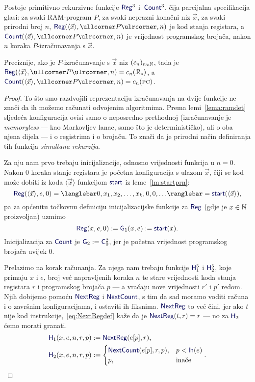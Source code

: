 \begin{lema}[{name=[primitivna rekurzivnost RAM-izračunavanja]}]\label{lm:RegCountprn}
Postoje primitivno rekurzivne funkcije $\f{Reg}^3$ i\, $\f{Count}^3$, čija parcijalna specifikacija glasi:
za svaki RAM-program $P$, za svaki neprazni konačni niz $\vec x$, za svaki prirodni broj $n$, $\f{Reg}(\langle \vec x\rangle,\kprog{P},n)$ je kod stanja registara, a $\f{Count}(\langle \vec x\rangle,\kprog{P},n)$ je vrijednost programskog brojača, nakon $n$ koraka $P$-izračunavanja s $\vec x$.
\end{lema}
Preciznije, ako je $P$-izračunavanje s $\vec x$ niz $(c_n)_{n\in{\mathbb N}}$, tada je $\f{Reg}(\langle\vec x\rangle, \kprog{P},n)=c_n(\reg{*})$, a $\f{Count}(\langle\vec x\rangle,\kprog{P},n)=c_n(\textsc{pc})$.
\begin{proof}
    To što smo razdvojili reprezentaciju izračunavanja na dvije funkcije ne znači da ih možemo računati odvojenim algoritmima. Prema lemi~\ref{lema:ramdet} sljedeća konfiguracija ovisi samo o neposredno prethodnoj (izračunavanje je \emph{memoryless} --- kao Markovljev lanac, samo što je determinističko), ali o oba njena dijela --- i o registrima i o brojaču. To znači da je prirodni način definiranja tih funkcija \emph{simultana rekurzija}.

Za nju nam prvo trebaju inicijalizacije, odnosno vrijednosti funkcija u $n=0$. Nakon $0$ koraka stanje registara je početna konfiguracija s ulazom $\vec x$, čiji se kod može dobiti iz koda $\langle\vec x\rangle$ funkcijom $\f{start}$ iz leme~\ref{lm:startprn}:
\begin{equation}
    \f{Reg}(\langle\vec x\rangle,e,0)=\knk{0,x_1,x_2,\dotsc,x_k,0,0,\dotsc}=\f{start}(\langle\vec x\rangle)\text,
\end{equation}
pa za općenitu točkovnu definiciju inicijalizacijske funkcije za $\f{Reg}$ (gdje je $x\in{\mathbb N}$ proizvoljan) uzmimo
\begin{equation}
    \f{Reg}(x,e,0):=\f G_1(x,e):=\f{start}(x)\text.
\end{equation}
Inicijalizacija za $\f{Count}$ je $\f G_2:=\f C_0^2$, jer je početna vrijednost programskog brojača uvijek $0$.

Prelazimo na korak računanja. Za njega nam trebaju funkcije $\f H_1^5$ i $\f H_2^5$, koje primaju $x$ i $e$, broj već napravljenih koraka $n$ te stare vrijednosti koda stanja registara $r$ i programskog brojača $p$ --- a vraćaju nove vrijednosti $r'$ i $p'$ redom. Njih dobijemo pomoću $\f{NextReg}$ i $\f{NextCount}$, s tim da sad moramo voditi računa i o završnim konfiguracijama, i ostaviti ih fiksnima. $\f{NextReg}$ to već čini, jer ako $t$ nije kod instrukcije,~\eqref{eq:NextRegdef} kaže da je $\f{NextReg}(t,r)=r$ --- no za $\f H_2$ ćemo morati granati.
\begin{align}
    \f H_1(x,e,n,r,p)&:=\f{NextReg}(e[p],r)\text,\\
    \f H_2(x,e,n,r,p)&:=\begin{cases}
        \f{NextCount}(e[p],r,p),&
        p<\f{lh}(e)\\
        p,&\text{inače}
    \end{cases}\text.
\end{align}


\end{proof}
